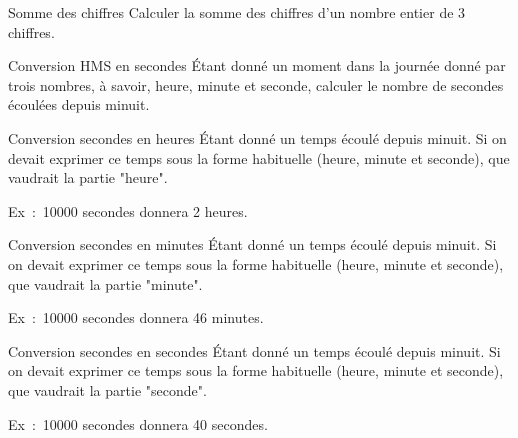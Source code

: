 		\begin{Exercice}{Somme des chiffres}
			Calculer la somme des chiffres
			d’un nombre entier de 3 chiffres.
		\end{Exercice}
	
		\begin{Exercice}{Conversion HMS en secondes}
			Étant donné un moment dans la journée donné
			par trois nombres, à savoir, heure, minute et seconde, calculer le
			nombre de secondes écoulées depuis minuit.
		\end{Exercice}
	
		\begin{Exercice}{Conversion secondes en heures}
			Étant donné un temps écoulé depuis minuit.
			Si on devait exprimer ce temps sous la forme
			habituelle (heure, minute et seconde),
			que vaudrait la partie "heure".
	
			Ex~:~10000 secondes donnera 2 heures.
		\end{Exercice}
	
		\begin{Exercice}{Conversion secondes en minutes}
			Étant donné un temps écoulé depuis minuit.
			Si on devait exprimer ce temps sous la forme
			habituelle (heure, minute et seconde),
			que vaudrait la partie "minute".
	
			Ex~:~10000 secondes donnera 46 minutes.
		\end{Exercice}
	
		\begin{Exercice}{Conversion secondes en secondes}
			Étant donné un temps écoulé depuis minuit.
			Si on devait exprimer ce temps sous la forme
			habituelle (heure, minute et seconde),
			que vaudrait la partie "seconde".
	
			Ex~:~10000 secondes donnera 40 secondes.
		\end{Exercice}	
		
	
